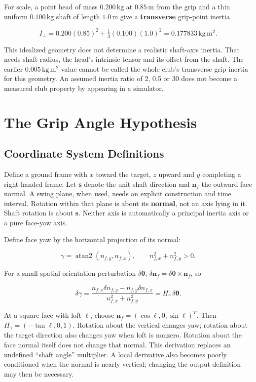 \documentclass[
  11pt,
]{article}
\begin{document}
For scale, a point head of mass \(0.200\,\mathrm{kg}\) at
\(0.85\,\mathrm m\) from the grip and a thin uniform
\(0.100\,\mathrm{kg}\) shaft of length \(1.0\,\mathrm m\) give a
\textbf{transverse} grip-point inertia

\[
I_\perp=0.200(0.85)^2+\tfrac13(0.100)(1.0)^2
=0.177833\,\mathrm{kg\,m^2}.
\]

This idealized geometry does not determine a realistic shaft-axis
inertia. That needs shaft radius, the head's intrinsic tensor and its
offset from the shaft. The earlier \(0.005\,\mathrm{kg\,m^2}\) value
cannot be called the whole club's transverse grip inertia for this
geometry. An assumed inertia ratio of 2, 0.5 or 30 does not become a
measured club property by appearing in a simulator.

\section{The Grip Angle Hypothesis}\label{the-grip-angle-hypothesis}

\subsection{Coordinate System
Definitions}\label{coordinate-system-definitions}

Define a ground frame with \(x\) toward the target, \(z\) upward and
\(y\) completing a right-handed frame. Let \(\mathbf s\) denote the unit
shaft direction and \(\mathbf n_f\) the outward face normal. A swing
plane, when used, needs an explicit construction and time interval.
Rotation within that plane is about its \textbf{normal}, not an axis
lying in it. Shaft rotation is about \(\mathbf s\). Neither axis is
automatically a principal inertia axis or a pure face-yaw axis.

Define face yaw by the horizontal projection of its normal:

\[
\gamma=\operatorname{atan2}(n_{f,y},n_{f,x}),\qquad
n_{f,x}^2+n_{f,y}^2>0.
\]

For a small spatial orientation perturbation
\(\delta\boldsymbol\theta\),
\(\delta\mathbf n_f=\delta\boldsymbol\theta\times\mathbf n_f\), so

\[
\delta\gamma=
\frac{n_{f,x}\delta n_{f,y}-n_{f,y}\delta n_{f,x}}
{n_{f,x}^2+n_{f,y}^2}
=H_\gamma\,\delta\boldsymbol\theta.
\]

At a square face with loft \(\ell\), choose
\(\mathbf n_f=(\cos\ell,0,\sin\ell)^T\). Then
\(H_\gamma=(-\tan\ell,0,1)\). Rotation about the vertical changes yaw;
rotation about the target direction also changes yaw when loft is
nonzero. Rotation about the face normal itself does not change that
normal. This derivation replaces an undefined ``shaft angle''
multiplier. A local derivative also becomes poorly conditioned when the
normal is nearly vertical; changing the output definition may then be
necessary.
\end{document}
